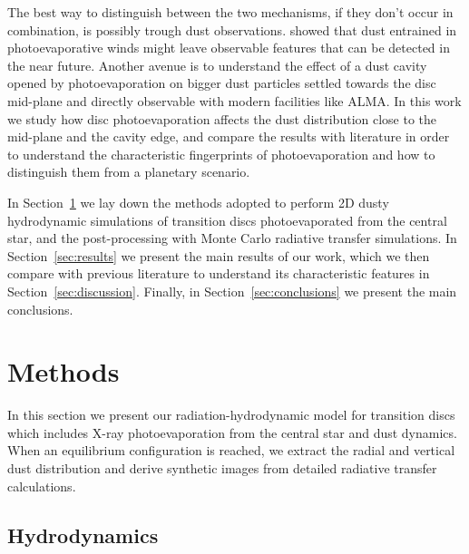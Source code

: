 \documentclass[fleqn,usenatbib]{mnras}
\begin{document}
The best way to distinguish between the two mechanisms, if they don't occur in combination, is possibly trough dust observations. \citet{Franz2022} showed that dust entrained in photoevaporative winds might leave observable features that can be detected in the near future.
Another avenue is to understand the effect of a dust cavity opened by photoevaporation on bigger dust particles settled towards the disc mid-plane and directly observable with modern facilities like ALMA.
In this work we study how disc photoevaporation affects the dust distribution close to the mid-plane and the cavity edge, and compare the results with literature in order to understand the characteristic fingerprints of photoevaporation and how to distinguish them from a planetary scenario.

In Section~\ref{sec:methods} we lay down the methods adopted to perform 2D dusty hydrodynamic simulations of transition discs photoevaporated from the central star, and the post-processing with Monte Carlo radiative transfer simulations. In Section~\ref{sec:results} we present the main results of our work, which we then compare with previous literature to understand its characteristic features in Section~\ref{sec:discussion}.
Finally, in Section~\ref{sec:conclusions} we present the main conclusions.

\section{Methods}\label{sec:methods}

    In this section we present our radiation-hydrodynamic model for transition discs which includes X-ray photoevaporation from the central star and dust dynamics. When an equilibrium configuration is reached, we extract the radial and vertical dust distribution and derive synthetic images from detailed radiative transfer calculations.

    \subsection{Hydrodynamics}\label{sec:hydro}
\end{document}
